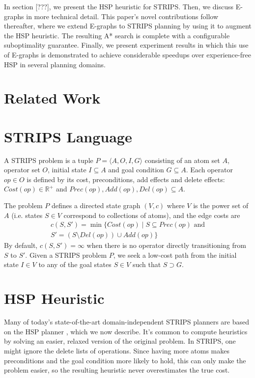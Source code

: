 \documentclass[letterpaper]{article}
\begin{document}
In section [???], we present the HSP heuristic for STRIPS.
Then, we discuss E-graphs in more technical detail.
This paper's novel contributions follow thereafter, where we extend E-graphs to STRIPS planning by using it to augment the HSP heuristic. 
The resulting A* search is complete with a configurable suboptimality guarantee.
Finally, we present experiment results in which this use of E-graphs is demonstrated to achieve considerable speedups over experience-free HSP in several planning domains.

\section{Related Work}

\section{STRIPS Language}

A STRIPS problem is a tuple $P = \langle A,O,I,G\rangle$ consisting of an atom set $A$, operator set $O$, initial state $I \subseteq A$ and goal condition $G \subseteq A$.
Each operator $op\in O$ is defined by its cost, preconditions, add effects and delete effects: $Cost(op) \in \mathbb{R}^+$ and $Prec(op),Add(op),Del(op) \subseteq A$.

The problem $P$ defines a directed state graph $(V,c)$ where $V$ is the power set of $A$ (i.e. states $S\in V$ correspond to collections of atoms), and the edge costs are
\begin{eqnarray*} c(S,S') = \min\{Cost(op) \mid S\subseteq Prec(op)\text{ and}
\\S' = \left(S \setminus Del(op)\right) \cup Add(op)\} \end{eqnarray*}
By default, $c(S,S') = \infty$ when there is no operator directly transitioning from $S$ to $S'$.
Given a STRIPS problem $P$, we seek a low-cost path from the initial state $I\in V$ to any of the goal states $S\in V$ such that $S \supset G$.

\section{HSP Heuristic}

Many of today's state-of-the-art domain-independent STRIPS planners are based on the HSP planner \cite{bonet2001planning}, which we now describe.
It's common to compute heuristics by solving an easier, relaxed version of the original problem. In STRIPS, one might ignore the delete lists of operations.
Since having more atoms makes preconditions and the goal condition more likely to hold, this can only make the problem easier, so the resulting heuristic never overestimates the true cost.
\end{document}
